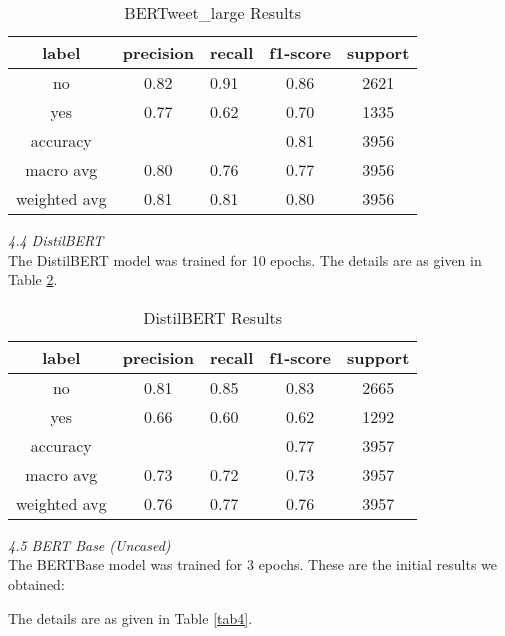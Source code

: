 \documentclass[a4paper, 10pt, conference]{IEEEtran}
\begin{document}
{{{\begin{table}[h!]
\centering
  \caption{BERTweet\_large Results}
  \label{tab2}
  \setlength{\tabcolsep}{6pt} %
  \renewcommand{\arraystretch}{1.2}%
    \begin{tabular}{c c l c c}
 \hline
    label & precision & recall & f1-score & support \\
    \hline
    no  & 0.82  &  0.91 &  0.86 & 2621 \\ %
    yes  & 0.77  &  0.62 &  0.70 & 1335 \\ %
    accuracy   &      &        &  0.81 & 3956 \\ %
    macro avg & 0.80 & 0.76 & 0.77 & 3956 \\ %
    weighted avg & 0.81 & 0.81 & 0.80 & 3956 \\ \hline
  \end{tabular}
\end{table}

\noindent\textit{4.4 DistilBERT}\\

The DistilBERT model was trained for 10 epochs. The details are as given in Table \ref{tab3}. 

\begin{table}[h!]
\centering
  \caption{DistilBERT Results}
  \label{tab3}
  \setlength{\tabcolsep}{6pt} %
  \renewcommand{\arraystretch}{1.2}%
    \begin{tabular}{c c l c c}
 \hline
    label & precision & recall & f1-score & support \\
    \hline
    no  & 0.81  &  0.85 &  0.83 & 2665 \\ %
    yes  & 0.66  &  0.60 &  0.62 & 1292 \\ %
    accuracy   &      &        &  0.77 & 3957 \\ %
    macro avg & 0.73 & 0.72 & 0.73 & 3957 \\ %
    weighted avg & 0.76 & 0.77 & 0.76 & 3957 \\ \hline
  \end{tabular}
\end{table}

\noindent\textit{4.5 BERT Base (Uncased)}\\

The BERTBase model was trained for 3 epochs. These are the initial results we obtained:

The details are as given in Table \ref{tab4}. \\

}}}
\end{document}
